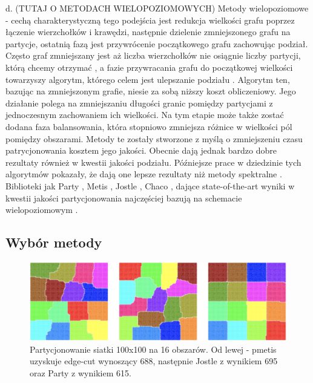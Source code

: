 d. (TUTAJ O METODACH WIELOPOZIOMOWYCH) Metody wielopoziomowe
\cite{metis, jostle, Bui1993AHF, 103500, 185177, 279334, inproceedings, 129970, 10.1145/165939.165942}
- cechą charakterystyczną tego podejścia jest redukcja
wielkości grafu poprzez łączenie wierzchołków i krawędzi, następnie dzielenie zmniejszonego grafu na partycje, ostatnią fazą
jest przywrócenie początkowego grafu zachowując podział. Często graf zmniejszany jest aż liczba wierzchołków nie osiągnie
liczby partycji, którą chcemy otrzymać \cite{1364754}, a fazie przywracania grafu do początkowej wielkości towarzyszy
algorytm, którego celem jest ulepszanie podziału \cite{article, 10.5555/800263.809204}. Algorytm ten, bazując na zmniejszonym
grafie, niesie za sobą niższy koszt obliczeniowy. Jego działanie polega na zmniejszaniu długości granic pomiędzy partycjami
z jednoczesnym zachowaniem ich wielkości. Na tym etapie może także zostać dodana faza balansowania, która stopniowo zmniejsza różnice
w wielkości pól pomiędzy obszarami. Metody te zostały stworzone z myślą o zmniejszeniu czasu
patrycjonowania kosztem jego jakości. Obecnie dają jednak bardzo dobre rezultaty również w kwestii jakości podziału.
Późniejsze prace w dziedzinie tych algorytmów pokazały, że dają one lepsze rezultaty niż metody spektralne \cite{metis}.
Biblioteki jak Party \cite{1364754}, Metis \cite{metis}, Jostle \cite{jostle}, Chaco \cite{inproceedings},
dające state-of-the-art wyniki w kwestii jakości partycjonowania najczęściej bazują na schemacie wielopoziomowym
\cite{inproceedings}.

\newpage
\subsection{Wybór metody}

\begin{figure}
    \vspace{-4mm}
    \includegraphics[width=\linewidth]{images/libraries-comparision}
    \caption{Partycjonowanie siatki 100x100 na 16 obszarów. Od lewej - pmetis\cite{metis} uzyskuje edge-cut wynoszący
    688, następnie Jostle\cite{jostle} z wynikiem 695 oraz Party\cite{1364754} z wynikiem 615.}
    \label{fig:test2}
\end{figure}

